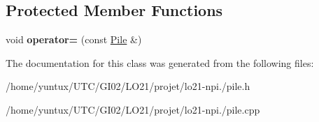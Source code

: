 \subsection*{\-Protected \-Member \-Functions}
\begin{DoxyCompactItemize}
\item 
\hypertarget{class_pile_a8d34708706c113ec9864f7c37c9083a2}{void {\bfseries operator=} (const \hyperlink{class_pile}{\-Pile} \&)}\label{class_pile_a8d34708706c113ec9864f7c37c9083a2}

\end{DoxyCompactItemize}


\-The documentation for this class was generated from the following files\-:\begin{DoxyCompactItemize}
\item 
/home/yuntux/\-U\-T\-C/\-G\-I02/\-L\-O21/projet/lo21-\/npi./pile.\-h\item 
/home/yuntux/\-U\-T\-C/\-G\-I02/\-L\-O21/projet/lo21-\/npi./pile.\-cpp\end{DoxyCompactItemize}
